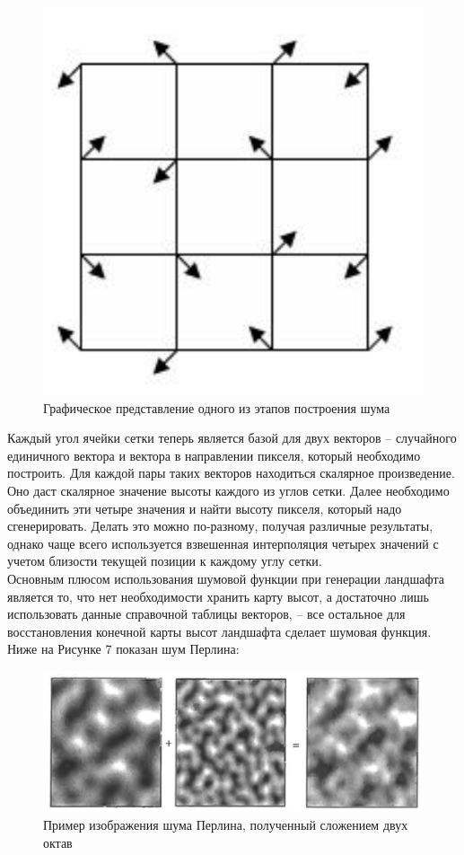 \documentclass[a4paper, 10pt]{article}
\begin{document}
	\clearpage
	\newpage
	\begin{figure}[h!]
		\centering
		\includegraphics[scale=0.8]{perlin}
		\centering\caption{Графическое представление одного из этапов построения шума}
	\end{figure}
	 \hspace*{5mm} Каждый угол ячейки сетки теперь является базой для двух векторов – случайного единичного вектора и вектора в направлении пикселя, который необходимо построить. Для каждой пары таких векторов находиться скалярное произведение. Оно даст скалярное значение высоты каждого из углов сетки. Далее необходимо объединить эти четыре значения и найти высоту пикселя, который надо сгенерировать. Делать это можно по-разному, получая различные результаты, однако чаще всего используется взвешенная интерполяция четырех значений с учетом близости текущей позиции к каждому углу сетки.
	\\ \hspace*{5mm} Основным плюсом использования шумовой функции при генерации ландшафта является то, что нет необходимости хранить карту высот, а достаточно лишь использовать данные справочной таблицы векторов, – все остальное для восстановления конечной карты высот ландшафта сделает шумовая функция.
	\\Ниже на Рисунке 7 показан шум Перлина:
	\begin{figure}[h!]
		\centering
		\includegraphics[scale=0.8]{perlin1}
		\centering\caption{Пример изображения шума Перлина, полученный сложением двух октав}
	\end{figure}
\end{document}
